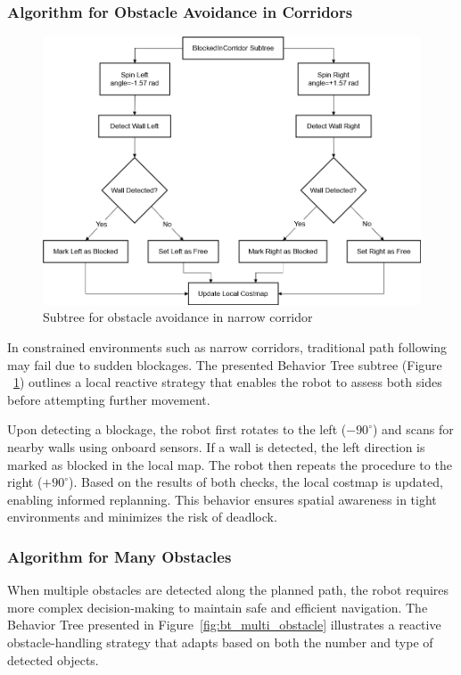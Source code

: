 \subsubsection{Algorithm for Obstacle Avoidance in Corridors}

\begin{figure}[H]
    \centering
    \includegraphics[width=0.8\linewidth]{Src//images/bttreecorodor.png}
    \caption{Subtree for obstacle avoidance in narrow corridor}
    \label{fig:bt_corridor}
\end{figure}

In constrained environments such as narrow corridors, traditional path following may fail due to sudden blockages. The presented Behavior Tree subtree (Figure ~\ref{fig:bt_corridor}) outlines a local reactive strategy that enables the robot to assess both sides before attempting further movement. 

Upon detecting a blockage, the robot first rotates to the left (\(-90^\circ\)) and scans for nearby walls using onboard sensors. If a wall is detected, the left direction is marked as blocked in the local map. The robot then repeats the procedure to the right (\(+90^\circ\)). Based on the results of both checks, the local costmap is updated, enabling informed replanning. This behavior ensures spatial awareness in tight environments and minimizes the risk of deadlock.


\subsubsection{Algorithm for Many Obstacles}
When multiple obstacles are detected along the planned path, the robot requires more complex decision-making to maintain safe and efficient navigation. The Behavior Tree presented in Figure~\ref{fig:bt_multi_obstacle} illustrates a reactive obstacle-handling strategy that adapts based on both the number and type of detected objects.

